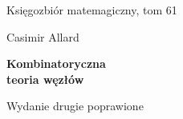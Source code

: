 

\usepackage{comment}
\usepackage{makeidx}
\usepackage{enumitem}
\usepackage{booktabs}
\usepackage{longtable}
\usepackage[table]{xcolor}
\usepackage[colorinlistoftodos,prependcaption]{todonotes}
\usepackage{tikz}
\usetikzlibrary{arrows.meta}
\usetikzlibrary{decorations.markings}
\usetikzlibrary{decorations.pathreplacing}
\usetikzlibrary{knots}



\let\oldtabular\tabular %
\let\endoldtabular\endtabular
\renewenvironment{tabular}
{\rowcolors{2}{white}{lightgray}\oldtabular}
{\endoldtabular}
\let\oldlongtable\longtable %
\let\endoldlongtable\endlongtable
\renewenvironment{longtable}
{\rowcolors{2}{white}{lightgray}\oldlongtable}
{\endoldlongtable}


\makeindex


\thispagestyle{empty}
{\noindent\fontsize{18pt}{18pt}\selectfont Księgozbiór matemagiczny, tom 61}

\noindent\makebox[\linewidth]{\rule{\textwidth}{1pt}}

\newpage

\thispagestyle{empty}
\phantom{nothing}
\newpage

\thispagestyle{empty}
{\noindent\fontsize{18pt}{18pt}\selectfont Casimir Allard}

\noindent\makebox[\linewidth]{\rule{\textwidth}{1pt}}

\vspace{10mm}

{\noindent\fontsize{24pt}{24pt}\selectfont \textbf{Kombinatoryczna\\teoria węzłów}}
\vspace{10mm}

{\noindent\fontsize{14pt}{14pt}\selectfont  Wydanie drugie poprawione}

